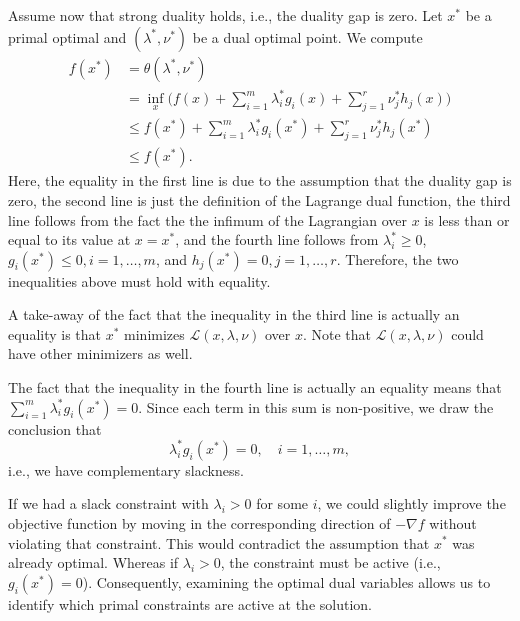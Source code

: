 \medskip




Assume now that strong duality holds, i.e., the duality gap is zero. Let $x^*$ be a primal optimal and $(\lambda^*,\nu^*)$ be a dual optimal point. We compute
\begin{align*}
f(x^*) & = \theta(\lambda^*,\nu^*) \\
& = \inf_x \Big( f(x) + \sum_{i=1}^m \lambda^{*}_i g_i(x)
+ \sum_{j=1}^r \nu^{*}_j h_j(x)\Big) \\
& \le f(x^*) + \sum_{i=1}^m \lambda^{*}_i g_i(x^*)
+ \sum_{j=1}^r \nu^{*}_j h_j(x^*) \\
& \le  f(x^*).  
\end{align*}
Here, the equality in the first line is due to the assumption that the duality gap is zero, the second line is just the definition of the Lagrange dual function, the third line follows from the fact the the infimum of the
Lagrangian over $x$ is less than or equal to its value at $x = x^*$, and the fourth line follows from $\lambda^{*}_i \ge 0$, $g_i(x^*) \le 0, i = 1,\dots,m$, and $h_j(x^*) = 0, j=1,\dots,r$. Therefore, the two inequalities above must hold with equality.

A take-away of the fact that the inequality in the third line is actually an equality is that $x^*$ minimizes $\mathcal{L}(x,\lambda,\nu)$ over $x$. Note that $\mathcal{L}(x,\lambda,\nu)$ could have other minimizers as well.

The fact that the inequality in the fourth line is actually an equality means that $\sum_{i=1}^m \lambda^{*}_i g_i(x^*)=0$. Since each term in this sum is non-positive, we draw the conclusion that
\begin{equation}\label{eq:slackness}
    \lambda^{*}_i g_i(x^*) = 0, \quad i=1,\dots,m,
\end{equation}
i.e., we have complementary slackness.

If we had a slack constraint with $\lambda_i > 0$ for some $i$, we could slightly improve the objective function by moving in the corresponding direction of $-\nabla f$ without violating that constraint. This would contradict the assumption that $x^*$ was already optimal. Whereas if $\lambda_i >0$, the constraint must be active (i.e., $g_i(x^*) = 0$). Consequently, examining the optimal dual variables allows us to identify which primal constraints are active at the solution.

